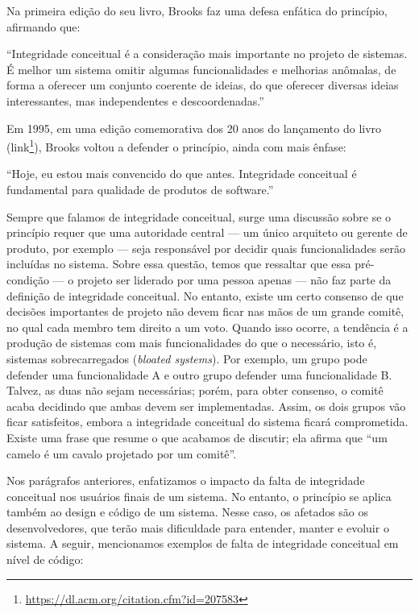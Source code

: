 \documentclass[
  11pt,
  twoside]{book}
\DeclareRobustCommand{\href}[2]{#2\footnote{\url{#1}}}
\renewenvironment{quote}{\centering \vspace{1.5ex} \begin{tcolorbox}[colback=backcolor, width=4.9in]}{\end{tcolorbox}}
\begin{document}
 Na primeira edição do seu livro, Brooks faz
uma defesa enfática do princípio, afirmando que:

\begin{quote}
``Integridade conceitual é a consideração mais importante no projeto de
sistemas. É melhor um sistema omitir algumas funcionalidades e melhorias
anômalas, de forma a oferecer um conjunto coerente de ideias, do que
oferecer diversas ideias interessantes, mas independentes e
descoordenadas.''
\end{quote}

Em 1995, em uma edição comemorativa dos 20 anos do lançamento do livro
(\href{https://dl.acm.org/citation.cfm?id=207583}{link}), Brooks voltou
a defender o princípio, ainda com mais ênfase:

\begin{quote}
``Hoje, eu estou mais convencido do que antes. Integridade conceitual é
fundamental para qualidade de produtos de software.''
\end{quote}

Sempre que falamos de integridade conceitual, surge uma discussão sobre
se o princípio requer que uma autoridade central --- um único arquiteto
ou gerente de produto, por exemplo --- seja responsável por decidir
quais funcionalidades serão incluídas no sistema. Sobre essa questão,
temos que ressaltar que essa pré-condição --- o projeto ser liderado por
uma pessoa apenas --- não faz parte da definição de integridade
conceitual. No entanto, existe um certo consenso de que decisões
importantes de projeto não devem ficar nas mãos de um grande comitê, no
qual cada membro tem direito a um voto. Quando isso ocorre, a tendência
é a produção de sistemas com mais funcionalidades do que o necessário,
isto é, sistemas sobrecarregados (\emph{bloated systems}). Por exemplo,
um grupo pode defender uma funcionalidade A e outro grupo defender uma
funcionalidade B. Talvez, as duas não sejam necessárias; porém, para
obter consenso, o comitê acaba decidindo que ambas devem ser
implementadas. Assim, os dois grupos vão ficar satisfeitos, embora a
integridade conceitual do sistema ficará comprometida. Existe uma frase
que resume o que acabamos de discutir; ela afirma que ``um camelo é um
cavalo projetado por um comitê''.

Nos parágrafos anteriores, enfatizamos o impacto da falta de integridade
conceitual nos usuários finais de um sistema. No entanto, o princípio se
aplica também ao design e código de um sistema. Nesse caso, os afetados
são os desenvolvedores, que terão mais dificuldade para entender, manter
e evoluir o sistema. A seguir, mencionamos exemplos de falta de
integridade conceitual em nível de código:
\end{document}
